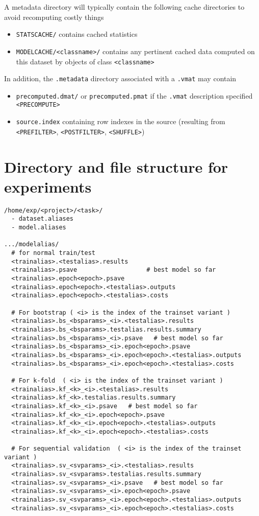 \documentclass[11pt]{book}
\begin{document}
A metadata directory will typically contain the following cache directories to avoid recomputing costly things

\begin{itemize}
\item \verb!STATSCACHE/! contains cached statistics
\item \verb!MODELCACHE/<classname>/! contains any pertinent cached data computed on this dataset by objects of class \verb!<classname>!
\end{itemize}

In addition, the {\tt .metadata} directory associated with a {\tt .vmat} may contain
\begin{itemize}
\item {\tt precomputed.dmat/} or {\tt precomputed.pmat} if the {\tt .vmat} description specified \verb!<PRECOMPUTE>!
\item {\tt source.index} containing row indexes in the source (resulting from \verb!<PREFILTER>!, \verb!<POSTFILTER>!, \verb!<SHUFFLE>!)
\end{itemize}

\section{Directory and file structure for experiments}

\begin{verbatim}
/home/exp/<project>/<task>/
  - dataset.aliases
  - model.aliases
   
.../modelalias/
  # for normal train/test
  <trainalias>.<testalias>.results
  <trainalias>.psave                   # best model so far
  <trainalias>.epoch<epoch>.psave
  <trainalias>.epoch<epoch>.<testalias>.outputs
  <trainalias>.epoch<epoch>.<testalias>.costs

  # For bootstrap ( <i> is the index of the trainset variant )
  <trainalias>.bs_<bsparams>_<i>.<testalias>.results
  <trainalias>.bs_<bsparams>.testalias.results.summary
  <trainalias>.bs_<bsparams>_<i>.psave   # best model so far
  <trainalias>.bs_<bsparams>_<i>.epoch<epoch>.psave
  <trainalias>.bs_<bsparams>_<i>.epoch<epoch>.<testalias>.outputs
  <trainalias>.bs_<bsparams>_<i>.epoch<epoch>.<testalias>.costs

  # For k-fold  ( <i> is the index of the trainset variant )
  <trainalias>.kf_<k>_<i>.<testalias>.results
  <trainalias>.kf_<k>.testalias.results.summary
  <trainalias>.kf_<k>_<i>.psave   # best model so far
  <trainalias>.kf_<k>_<i>.epoch<epoch>.psave
  <trainalias>.kf_<k>_<i>.epoch<epoch>.<testalias>.outputs
  <trainalias>.kf_<k>_<i>.epoch<epoch>.<testalias>.costs
  
  # For sequential validation  ( <i> is the index of the trainset variant )
  <trainalias>.sv_<svparams>_<i>.<testalias>.results
  <trainalias>.sv_<svparams>.testalias.results.summary
  <trainalias>.sv_<svparams>_<i>.psave   # best model so far
  <trainalias>.sv_<svparams>_<i>.epoch<epoch>.psave
  <trainalias>.sv_<svparams>_<i>.epoch<epoch>.<testalias>.outputs
  <trainalias>.sv_<svparams>_<i>.epoch<epoch>.<testalias>.costs
\end{verbatim}
\end{document}
